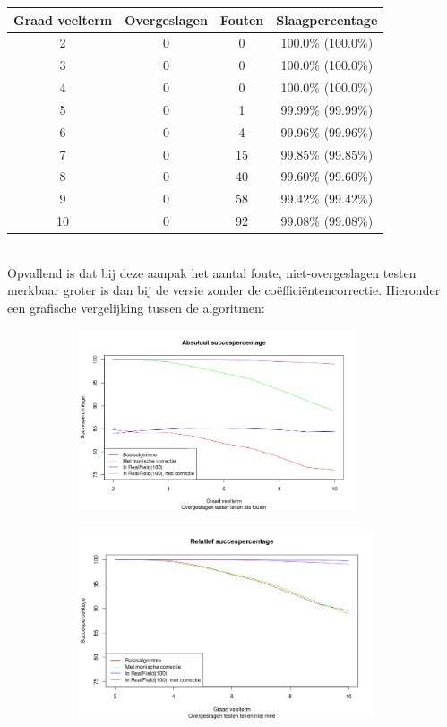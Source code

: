 \documentclass{article}
\begin{document}
\begin{tabular}{|c|c|c|c|}
 \hline
 \textbf{Graad veelterm} & \textbf{Overgeslagen} & \textbf{Fouten} & \textbf{Slaagpercentage} \\
 \hline
 2  & 0 & 0    & 100.0\% (100.0\%) \\
 3  & 0 & 0    & 100.0\% (100.0\%) \\
 4  & 0 & 0    & 100.0\% (100.0\%) \\
 5  & 0 & 1    & 99.99\% (99.99\%) \\
 6  & 0 & 4    & 99.96\% (99.96\%) \\
 7  & 0 & 15   & 99.85\% (99.85\%) \\
 8  & 0 & 40   & 99.60\% (99.60\%) \\
 9  & 0 & 58   & 99.42\% (99.42\%) \\
 10 & 0 & 92   & 99.08\% (99.08\%) \\
 \hline
\end{tabular} \\
Opvallend is dat bij deze aanpak het aantal foute, niet-overgeslagen testen merkbaar groter is dan bij de versie zonder de co\"effici\"entencorrectie.
Hieronder een grafische vergelijking tussen de algoritmen:
\begin{figure}[!htb]
 \caption{Vergelijking algortimen}
 \begin{subfigure}{0.49\textwidth}
   \includegraphics[width=0.9\textwidth]{figures/plot_abs}
 \end{subfigure}
 \begin{subfigure}{0.49\textwidth}
  \includegraphics[width=0.95\textwidth]{figures/plot_rel}
 \end{subfigure}
\end{figure}
\end{document}
